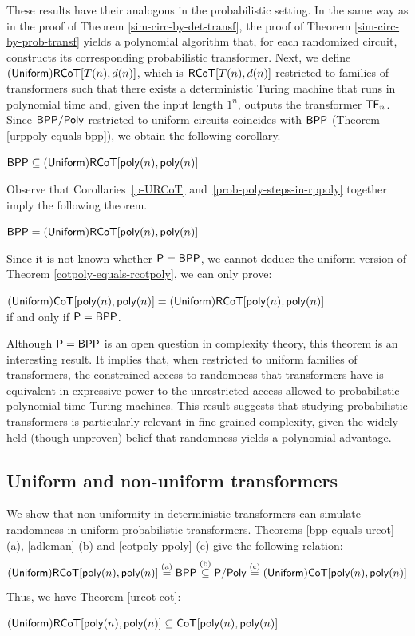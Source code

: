 These results have their analogous in the probabilistic setting.
In the same way as in the proof of Theorem \ref{sim-circ-by-det-transf}, the proof of Theorem \ref{sim-circ-by-prob-transf} yields a polynomial algorithm that, for each randomized circuit, constructs its corresponding probabilistic transformer.
Next, we define $\mathsf{(Uniform) RCoT}[T(n), d(n)]$, which is $\mathsf{RCoT}[T(n), d(n)]$ restricted to families of transformers such that there exists a deterministic Turing machine that runs in polynomial time and, given the input length $1^{n}$, outputs the transformer $\mathsf{TF}_n$.
Since $\mathsf{BPP/Poly}$ restricted to uniform circuits coincides with $\mathsf{BPP}$ (Theorem \ref{urppoly-equals-bpp}), we obtain the following corollary.
%
\begin{corollary}\label{p-URCoT}
    $\mathsf{BPP} \subseteq \mathsf{(Uniform) RCoT}[\mathsf{poly}(n), \mathsf{poly}(n)]$
\end{corollary}
%
\noindent Observe that Corollaries~\ref{p-URCoT} and~\ref{prob-poly-steps-in-rppoly} together imply the following theorem.
%
\begin{theorem}\label{bpp-equals-urcot}
    $\mathsf{BPP} = \mathsf{(Uniform) RCoT}[\mathsf{poly}(n), \mathsf{poly}(n)]$
\end{theorem}


Since it is not known whether $\mathsf{P} = \mathsf{BPP}$, we cannot deduce the uniform version of Theorem \ref{cotpoly-equals-rcotpoly}, we can only prove:
%
\begin{theorem}\label{p-bpp-iff-ucot-urcot}
    $\mathsf{(Uniform) CoT}[\mathsf{poly}(n), \mathsf{poly}(n)] = \mathsf{(Uniform) RCoT}[\mathsf{poly}(n), \mathsf{poly}(n)]$ \\ \indent if and only if $\mathsf{P} = \mathsf{BPP}$.
\end{theorem}

Although $\mathsf{P} = \mathsf{BPP}$ is an open question in complexity theory, this theorem is an interesting result.
It implies that, when restricted to uniform families of transformers, the constrained access to randomness that transformers have is equivalent in expressive power to the unrestricted access allowed to probabilistic polynomial-time Turing machines.
This result suggests that studying probabilistic transformers is particularly relevant in fine-grained complexity, given the widely held (though unproven) belief that randomness yields a polynomial advantage.




\subsection{Uniform and non-uniform transformers}

We show that non-uniformity in deterministic transformers can simulate randomness in uniform probabilistic transformers.
Theorems \ref{bpp-equals-urcot} (a), \ref{adleman} (b) and \ref{cotpoly-ppoly} (c) give the following relation:\[
    \mathsf{(Uniform) RCoT}[\mathsf{poly}(n), \mathsf{poly}(n)] \stackrel{\text{(a)}}{=} \mathsf{BPP} \stackrel{\text{(b)}}{\subseteq} \mathsf{P/Poly} \stackrel{\text{(c)}}{=} \mathsf{(Uniform) CoT}[\mathsf{poly}(n), \mathsf{poly}(n)]
\]
%
\noindent Thus, we have Theorem \ref{urcot-cot}:
%
\begin{theorem}\label{urcot-cot}
    $\mathsf{(Uniform) RCoT}[\mathsf{poly}(n), \mathsf{poly}(n)] \subseteq \mathsf{CoT}[\mathsf{poly}(n), \mathsf{poly}(n)]$
\end{theorem}
